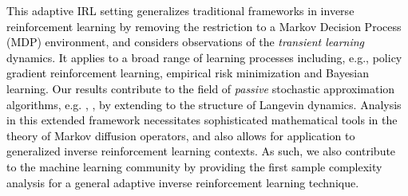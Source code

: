 \documentclass[journal,onecolumn]{IEEEtran}
\newcommand{\alk}{\alpha_k}
\newcommand{\alkk}{\alpha_{k+1}}
\newcommand{\step}{\epsilon}
\newcommand{\gradn}{\hat{\nabla}}
\newcommand{\rew}{J}
\newcommand{\gaus}{\mathcal{N}}
\newcommand{\reals}{\mathbb{R}}
\newcommand{\noisek}{w_k}
\newcommand{\dimn}{N}
\newcommand{\gibbs}{\ids_{\infty}}
\newcommand{\idistr}{\ids_0}
\newcommand{\N}{\mathbb{N}}
\newcommand{\ids}{\pi}
\newcommand{\gibbsnorm}{\Lambda}
\begin{document}
\textcolor{black}{This adaptive IRL setting generalizes traditional frameworks in inverse reinforcement learning by removing the restriction to a Markov Decision Process (MDP) environment, and considers observations of the \textit{transient learning} dynamics. It applies to a broad range of learning processes including, e.g., policy gradient reinforcement learning, empirical risk minimization and Bayesian learning. Our results contribute to the field of \textit{passive} stochastic approximation algorithms, e.g. \cite{nazin1989passive}, \cite{YY96}, by extending to the structure of Langevin dynamics. Analysis in this extended framework necessitates sophisticated mathematical tools in the theory of Markov diffusion operators, and also allows for application to generalized inverse reinforcement learning contexts. As such, we also contribute to the machine learning community by providing the first sample complexity analysis for a general adaptive inverse reinforcement learning technique. }

\end{document}
